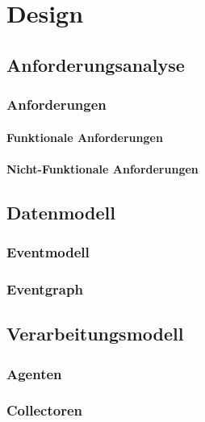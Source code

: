 %

\chapter{Design}

\section{Anforderungsanalyse}
\subsection{Anforderungen}
\subsubsection{Funktionale Anforderungen}
\subsubsection{Nicht-Funktionale Anforderungen}
\section{Datenmodell}
\subsection{Eventmodell}
\subsection{Eventgraph}
\section{Verarbeitungsmodell}
\subsection{Agenten}
\subsection{Collectoren}

